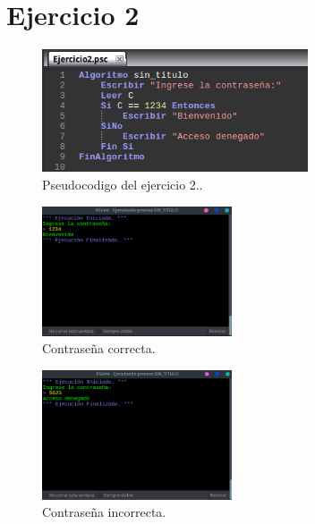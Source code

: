 \documentclass[11pt, a4paper]{report}
\begin{document}
 \newpage	
\section*{Ejercicio 2}

\begin{figure}[!ht]
\begin{center}
  \includegraphics[width=0.7\textwidth]{ejercicio2.png}
  \caption{Pseudocodigo del ejercicio 2..}
\end{center}
\end{figure}

\begin{figure}[!ht]
\begin{center}
  \includegraphics[width=0.5\textwidth]{respuesta3.png}
  \caption{Contraseña correcta.}
\end{center}
\end{figure}

\begin{figure}[!ht]
\begin{center}
  \includegraphics[width=0.5\textwidth]{respuesta4.png}
  \caption{Contraseña incorrecta.}
\end{center}
\end{figure}
\end{document}
